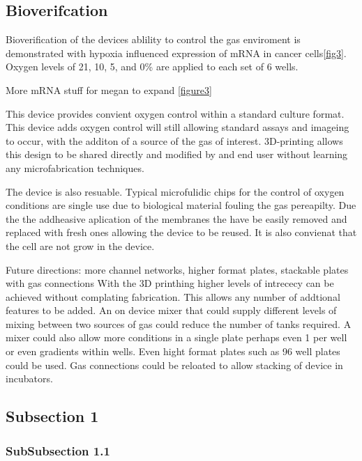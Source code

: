 \subsection*{Bioverifcation}
Bioverification of the devices ablility to control the gas enviroment is demonstrated with hypoxia influenced expression of mRNA in cancer cells\ref{fig3}.
Oxygen levels of 21, 10, 5, and 0\% are applied to each set of 6 wells. 

More mRNA stuff for megan to expand \ref{figure3}

This device provides convient oxygen control within a standard culture format.
This device adds oxygen control will still allowing standard assays and imageing to occur, with the additon of a source of the gas of interest.
3D-printing allows this design to be shared directly and modified by and end user without learning any microfabrication techniques.

The device is also resuable. Typical microfulidic chips for the control of oxygen conditions are single use due to biological material fouling the gas pereapilty. 
Due the the addheasive aplication of the membranes the have be easily removed and replaced with fresh ones allowing the device to be reused. 
It is also convienat that the cell are not grow in the device.


Future directions: more channel networks, higher format plates, stackable plates with gas connections
With the 3D printhing higher levels of intrececy can be achieved without complating fabrication.
This allows any number of addtional features to be added.
An on device mixer that could supply different levels of mixing between two sources of gas could reduce the number of tanks required.
A mixer could also allow more conditions in a single plate perhaps even 1 per well or even gradients within wells.
Even hight format plates such as 96 well plates could be used.
Gas connections could be reloated to allow stacking of device in incubators.

\subsection*{Subsection 1}

\subsubsection*{SubSubsection 1.1}


